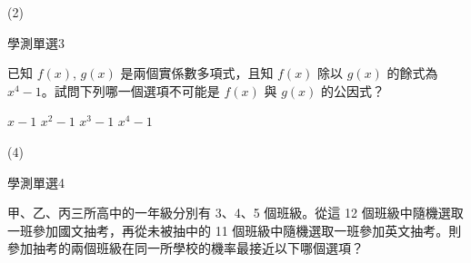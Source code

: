 \begin{QUESTIONS}
\begin{QUESTION}
        \begin{QANS}
            (2)
        \end{QANS}
        \begin{QSOLLIST}
        \end{QSOLLIST}
        \begin{QEMPTYSPACE}
        \end{QEMPTYSPACE}
    \end{QUESTION}
    \begin{QUESTION}
        \begin{ExamInfo}{98}{學測}{單選}{3}
        \end{ExamInfo}
        \begin{ExamAnsRateInfo}{27}{39}{25}{17}
        \end{ExamAnsRateInfo}
        \begin{QBODY}
            已知 $f(x)$, $g(x)$ 是兩個實係數多項式，且知 $f(x)$ 除以 $g(x)$ 的餘式為 $x^4 -1$。試問下列哪一個選項不可能是 $f(x)$ 與 $g(x)$ 的公因式？ 
			\begin{QOPS} 
				\QOP $x-1$ 
				\QOP $x^2-1$ 
				\QOP $x^3-1$ 
				\QOP $x^4-1$
			\end{QOPS}
        \end{QBODY}
        \begin{QFROMS}
        \end{QFROMS}
        \begin{QTAGS}\end{QTAGS}
        \begin{QANS}
            (4)
        \end{QANS}
        \begin{QSOLLIST}
        \end{QSOLLIST}
        \begin{QEMPTYSPACE}
        \end{QEMPTYSPACE}
    \end{QUESTION}
    \begin{QUESTION}
        \begin{ExamInfo}{98}{學測}{單選}{4}
        \end{ExamInfo}
        \begin{ExamAnsRateInfo}{42}{80}{38}{8}
        \end{ExamAnsRateInfo}
        \begin{QBODY}
            甲、乙、丙三所高中的一年級分別有 3、4、5 個班級。從這 12 個班級中隨機選取一班參加國文抽考，再從未被抽中的 11 個班級中隨機選取一班參加英文抽考。則參加抽考的兩個班級在同一所學校的機率最接近以下哪個選項？

\end{QBODY}
\end{QUESTION}
\end{QUESTIONS}
